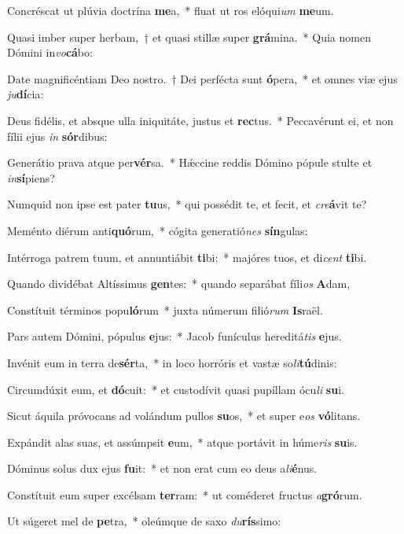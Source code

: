 \item Concréscat ut plúvia doctrína \textbf{me}a,~* fluat ut ros elóqui\textit{um} \textbf{me}um.
\item Quasi imber super herbam,~† et quasi stillæ super \textbf{grá}mina.~* Quia nomen Dómini in\textit{vo}\textbf{cá}bo:
\item Date magnificéntiam Deo nostro.~† Dei perfécta sunt \textbf{ó}pera,~* et omnes viæ ejus \textit{ju}\textbf{dí}cia:
\item Deus fidélis, et absque ulla iniquitáte, justus et \textbf{rec}tus.~* Peccavérunt ei, et non fílii ejus \textit{in} \textbf{sór}dibus:
\item Generátio prava atque per\textbf{vér}sa.~* Hǽccine reddis Dómino pópule stulte et \textit{in}\textbf{sí}piens?
\item Numquid non ipse est pater \textbf{tu}us,~* qui possédit te, et fecit, et \textit{cre}\textbf{á}vit te?
\item Meménto diérum anti\textbf{quó}rum,~* cógita generatió\textit{nes} \textbf{sín}gulas:
\item Intérroga patrem tuum, et annuntiábit \textbf{ti}bi:~* majóres tuos, et di\textit{cent} \textbf{ti}bi.
\item Quando dividébat Altíssimus \textbf{gen}tes:~* quando separábat fíli\textit{os} \textbf{A}dam,
\item Constítuit términos popu\textbf{ló}rum~* juxta númerum filió\textit{rum} \textbf{Is}raël.
\item Pars autem Dómini, pópulus \textbf{e}jus:~* Jacob funículus hereditá\textit{tis} \textbf{e}jus.
\item Invénit eum in terra de\textbf{sér}ta,~* in loco horróris et vastæ so\textit{li}\textbf{tú}dinis:
\item Circumdúxit eum, et \textbf{dó}cuit:~* et custodívit quasi pupíllam ócu\textit{li} \textbf{su}i.
\item Sicut áquila próvocans ad volándum pullos \textbf{su}os,~* et super e\textit{os} \textbf{vó}litans.
\item Expándit alas suas, et assúmpsit \textbf{e}um,~* atque portávit in húme\textit{ris} \textbf{su}is.
\item Dóminus solus dux ejus \textbf{fu}it:~* et non erat cum eo deus a\textit{li}\textbf{é}nus.
\item Constítuit eum super excélsam \textbf{ter}ram:~* ut coméderet fructus \textit{a}\textbf{gró}rum.
\item Ut súgeret mel de \textbf{pe}tra,~* oleúmque de saxo \textit{du}\textbf{rís}simo:
